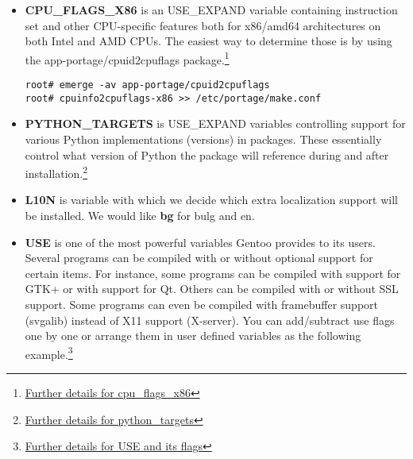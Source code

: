 \documentclass[10pt,a4paper]{article}
\begin{document}
\begin{enumerate}
\begin{enumerate}[label*=\arabic*.]
\begin{itemize}
				
				
				\item \textbf{CPU\_FLAGS\_X86} is an USE\_EXPAND variable containing instruction set and other CPU-specific features both for x86/amd64 architectures on both Intel and AMD CPUs. The easiest way to determine those is by using the app-portage/cpuid2cpuflags package.\footnote{\href{https://wiki.gentoo.org/wiki/CPU_FLAGS_X86}{Further details for cpu\_flags\_x86}}
				
				\begin{lstlisting}[style=BashInputRoot]					
root# emerge -av app-portage/cpuid2cpuflags
root# cpuinfo2cpuflags-x86 >> /etc/portage/make.conf
				\end{lstlisting}
				
				
				
				\item \textbf{PYTHON\_TARGETS} is USE\_EXPAND variables controlling support for various Python implementations (versions) in packages. These essentially control what version of Python the package will reference during and after installation.\footnote{\href{https://wiki.gentoo.org/wiki/Project:Python/PYTHON_TARGETS}{Further details for python\_targets}}
				
				
				
				\item \textbf{L10N} is variable with which we decide which extra localization support will be installed. We would like \textbf{bg} for bulg and en.
				
				
				
				\item \textbf{USE} is one of the most powerful variables Gentoo provides to its users. Several programs can be compiled with or without optional support for certain items. For instance, some programs can be compiled with support for GTK+ or with support for Qt. Others can be compiled with or without SSL support. Some programs can even be compiled with framebuffer support (svgalib) instead of X11 support (X-server). You can add/subtract use flags one by one or arrange them in user defined variables as the following example.\footnote{\href{https://wiki.gentoo.org/wiki/Handbook:AMD64/Installation/Base\#Configuring_the_USE_variable}{Further details for USE and its flags}}
				

\end{itemize}
\end{enumerate}
\end{enumerate}
\end{document}
